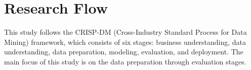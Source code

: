 \section{Research Flow}

This study follows the CRISP-DM (Cross-Industry Standard Process for Data Mining) framework, which consists of six stages: business understanding, data understanding, data preparation, modeling, evaluation, and deployment. The main focus of this study is on the data preparation through evaluation stages.
